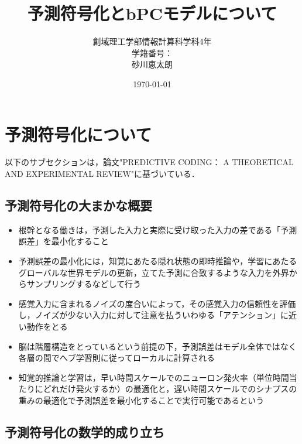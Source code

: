 \documentclass[a4paper, titlepage]{jsarticle}
\title{\Huge 予測符号化とbPCモデルについて}
\author{\Large 創域理工学部\quad 情報計算科学科\quad 4年\\\Large 学籍番号\;：\;6322045\\\Large 砂川恵太朗}
\date{\today}
\begin{document}
\maketitle

\section{予測符号化について}
以下のサブセクションは，論文"PREDICTIVE CODING： A THEORETICAL AND EXPERIMENTAL REVIEW"に基づいている．
\subsection{予測符号化の大まかな概要}
\begin{itemize}
   \item 根幹となる働きは，予測した入力と実際に受け取った入力の差である「予測誤差」を最小化すること
   \item 予測誤差の最小化には，知覚にあたる隠れ状態の即時推論や，学習にあたるグローバルな世界モデルの更新，立てた予測に合致するような入力を外界からサンプリングするなどして行う
   \item 感覚入力に含まれるノイズの度合いによって，その感覚入力の信頼性を評価し，ノイズが少ない入力に対して注意を払ういわゆる「アテンション」に近い動作をとる
   \item 脳は階層構造をとっているという前提の下，予測誤差はモデル全体ではなく各層の間でへブ学習則に従ってローカルに計算される
   \item 知覚的推論と学習は，早い時間スケールでのニューロン発火率（単位時間当たりにどれだけ発火するか）の最適化と，遅い時間スケールでのシナプスの重みの最適化で予測誤差を最小化することで実行可能であるという
\end{itemize}

\subsection{予測符号化の数学的成り立ち}
\end{document}
